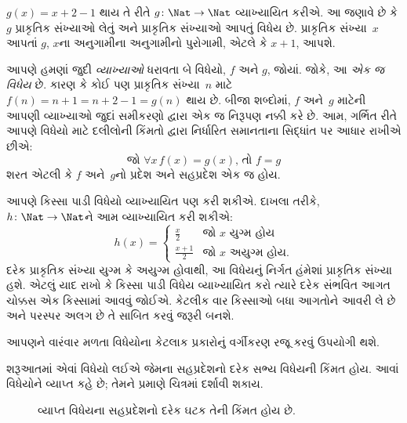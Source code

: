 \begin{ex}
$g(x) = x+2-1$ થાય તે રીતે $g \colon \Nat \to \Nat$
વ્યાખ્યાયિત કરીએ. આ જણાવે છે કે $g$ પ્રાકૃતિક સંખ્યાઓ
લેતું અને પ્રાકૃતિક સંખ્યાઓ આપતું વિધેય છે.
પ્રાકૃતિક સંખ્યા~$x$ આપતાં $g$, $x$ના અનુગામીના
અનુગામીનો પુરોગામી, એટલે કે $x+1$, આપશે.
\end{ex}

\begin{explain}
આપણે હમણાં જુદી \emph{વ્યાખ્યાઓ} ધરાવતા બે વિધેયો,
$f$ અને $g$, જોયાં. જોકે, આ \emph{એક જ વિધેય} છે.
કારણ કે કોઈ પણ પ્રાકૃતિક સંખ્યા~$n$ માટે
$f(n) = n+1 = n+2-1 =
g(n)$ થાય છે. બીજા શબ્દોમાં, $f$ અને~$g$ માટેની આપણી
વ્યાખ્યાઓ જુદાં સમીકરણો દ્વારા એક જ નિરૂપણ નક્કી કરે છે.
આમ, ગર્ભિત રીતે આપણે વિધેયો માટે દલીલોની કિંમતો દ્વારા
નિર્ધારિત સમાનતાના સિદ્ધાંત પર આધાર રાખીએ છીએ:
\[
  \text{જો }\forall x\, f(x) = g(x)\text{, તો }f = g
\]
શરત એટલી કે $f$ અને~$g$નો પ્રદેશ અને સહપ્રદેશ એક જ હોય.
\end{explain}

\begin{ex}
આપણે કિસ્સા પાડી વિધેયો વ્યાખ્યાયિત પણ કરી શકીએ.
દાખલા તરીકે, $h \colon \Nat \to \Nat$ને આમ વ્યાખ્યાયિત
કરી શકીએ:
\[
h(x) =
\begin{cases}
  \frac{x}{2} & \text{જો $x$ યુગ્મ હોય} \\
  \frac{x+1}{2} & \text{જો $x$ અયુગ્મ હોય.}
\end{cases}
\]
દરેક પ્રાકૃતિક સંખ્યા યુગ્મ કે અયુગ્મ હોવાથી, આ વિધેયનું
નિર્ગત હંમેશાં પ્રાકૃતિક સંખ્યા હશે. એટલું યાદ રાખો કે
કિસ્સા પાડી વિધેય વ્યાખ્યાયિત કરો ત્યારે દરેક સંભવિત
આગત ચોક્કસ એક કિસ્સામાં આવવું જોઈએ. કેટલીક વાર
કિસ્સાઓ બધા આગતોને આવરી લે છે અને પરસ્પર અલગ છે
તે સાબિત કરવું જરૂરી બનશે.
\end{ex}
\endgroup


\begingroup
\makeatletter{}\makeatother

\label{guunit:OLP-0022}


\begin{explain}
આપણને વારંવાર મળતા વિધેયોના કેટલાક પ્રકારોનું
વર્ગીકરણ રજૂ કરવું ઉપયોગી થશે.

શરૂઆતમાં એવાં વિધેયો લઈએ જેમના સહપ્રદેશનો દરેક સભ્ય
વિધેયની કિંમત હોય. આવાં વિધેયોને વ્યાપ્ત કહે છે;
તેમને  પ્રમાણે ચિત્રમાં દર્શાવી શકાય.

\begin{figure}
  \caption{વ્યાપ્ત વિધેયના સહપ્રદેશનો દરેક
    ઘટક તેની કિંમત હોય છે.}
\end{figure}
\end{explain}


